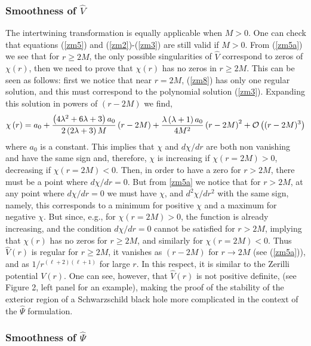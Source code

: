 \documentclass[aps,floats,showpacs,amssymb,tightenlines]{revtex4}
\begin{document}
\subsubsection{ Smoothness of $\hat V$}

The intertwining transformation is equally applicable when $M>0$. One can check that equations
(\ref{zm5}) and (\ref{zm2})-(\ref{zm3}) are still valid if $M>0$. From (\ref{zm5a}) we see that for $r \geq 2M$, the only possible singularities of $\hat{V}$ correspond to zeros of $\chi(r)$, then we need to prove that $\chi(r)$ has no zeros in $r \geq 2M$.
This can be seen as follows: first we notice that near $r=2M$, (\ref{zm8}) has only one regular solution, and this must correspond to the
polynomial solution (\ref{zm3}). Expanding this solution in powers of $(r-2M)$ we find,
\begin{equation}
\label{posM01}
\chi \left( r \right) ={  a_0}
+{\frac {  \left( 4{
\lambda}^{2}+6\lambda+3 \right) {a_0}   }{ 2\left( 2
\lambda+3 \right) M}}\left( r-2M \right)
+{\frac {\lambda  \left( \lambda+
1 \right) {a_0} }{4 {M}^{2}}} \left( r-2M \right) ^{2}
+{\cal{O}} \left( (r-2M ) ^{3}\right)
\end{equation}
where $a_0$ is a constant. This implies that $\chi$ and $d\chi/dr$ are both non vanishing and have the same sign and, therefore, $\chi$ is increasing if $\chi(r=2M)>0$,  decreasing if $\chi(r=2M)<0$. Then, in order to have a zero for $r>2M$, there must be a point where $d\chi/dr=0$. But from \ref{zm5a} we notice that for $r>2M$, at any point where $d\chi/dr=0$ we must have $\chi$, and $d^2\chi/dr^2$ with the
 same sign, namely, this corresponds to a minimum for positive $\chi$ and a maximum for negative $\chi$. But since, e.g., for $\chi(r=2M) >0$, the function is already increasing, and the condition $d\chi/dr=0$ cannot be satisfied for $r >2M$,
  implying that $\chi(r)$ has no zeros for $r \geq 2M$, and similarly for $\chi(r=2M)<0$. Thus $\hat{V}(r)$ is regular for $r\geq 2M$,
   it vanishes as $(r-2M)$ for $r \to 2M$ (see  (\ref{zm5a})), and as $1/r^{(\ell+2)(\ell+1)}$ for large $r$. In this respect, it is similar to the Zerilli potential $V(r)$. One can see, however, that $\hat{V}(r)$ is not positive definite, (see Figure 2, left panel for an example), making the proof of the stability of the exterior region of a Schwarzschild black hole more complicated in the context of the $\hat \Psi$ formulation.

\subsubsection{ Smoothness of $\hat \Psi$}
\end{document}
